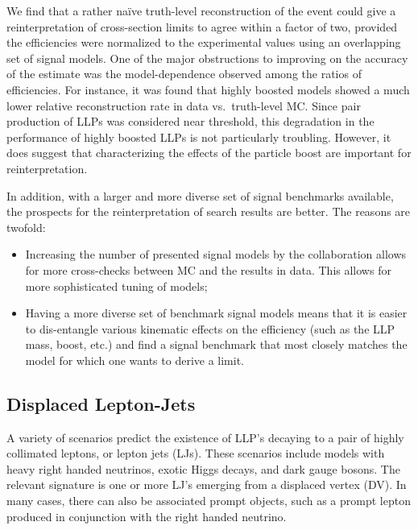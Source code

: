 \vskip 0.1in
\vskip 0.1in

We find that a rather na\"ive truth-level reconstruction of the event could give a reinterpretation of cross-section limits to agree within a factor of two, provided the efficiencies were normalized to the experimental values using an overlapping set of signal models. One of the major obstructions to improving on the accuracy of the estimate was the model-dependence observed among the ratios of efficiencies. For instance, it was found that highly boosted models showed a much lower relative reconstruction rate in data vs.~truth-level MC. Since pair production of LLPs was considered near threshold, this degradation in the performance of highly boosted LLPs is not particularly troubling. However, it does suggest that characterizing the effects of the particle boost are important for reinterpretation.

In addition, with a larger and more diverse set of signal benchmarks available, the prospects for the reinterpretation of search results are better. The reasons are twofold:~
%
\begin{itemize}
\item Increasing the number of presented signal models by the collaboration allows for more cross-checks between MC and the results in data. This allows for more sophisticated tuning of models;
\item Having a more diverse set of benchmark signal models means that it is easier to dis-entangle various kinematic effects on the efficiency (such as the LLP mass, boost, etc.) and find a signal benchmark that most closely matches the model for which one wants to derive a limit.
\end{itemize}
%

\subsection{Displaced Lepton-Jets}

A variety of scenarios predict the existence of LLP's decaying to a pair of highly collimated leptons, or lepton jets (LJs). These scenarios include models with heavy right handed neutrinos, exotic Higgs decays, and dark gauge bosons. The relevant signature is one or more LJ's emerging from a displaced vertex (DV). In many cases, there can also be associated prompt objects, such as a prompt lepton produced in conjunction with the right handed neutrino. 

